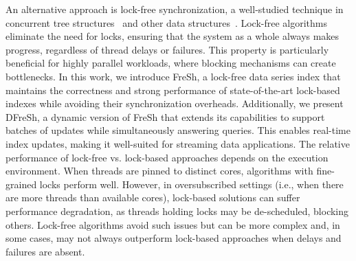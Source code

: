 \documentclass[a4paper,11pt,twoside,openany]{book}
\begin{document}
An alternative approach is lock-free synchronization, a well-studied technique in concurrent 
tree structures~\cite{EFRB10,EFHR14,FR2018,ABF+22} and other data structures~\cite{F04,HS08,FKR18}. 
Lock-free algorithms eliminate the need for locks, ensuring that the system as a whole 
always makes progress, regardless of thread delays or failures. This property is particularly 
beneficial for highly parallel workloads, where blocking mechanisms can create bottlenecks. 
%
In this work, we introduce FreSh, a lock-free data series index that maintains the 
correctness and strong performance of state-of-the-art lock-based indexes while avoiding 
their synchronization overheads. Additionally, we present DFreSh, a dynamic version of 
FreSh that extends its capabilities to support batches of updates while simultaneously 
answering queries. This enables real-time index updates, making it well-suited for streaming
data applications.
%
The relative performance of lock-free vs. lock-based approaches depends on the execution environment.
When threads are pinned to distinct cores, algorithms with fine-grained locks perform well. 
However, in oversubscribed settings (i.e., when there are more threads than available cores),
lock-based solutions can suffer performance degradation, as threads holding locks may be
de-scheduled, blocking others. Lock-free algorithms avoid such issues but can be more complex and,
in some cases, may not always outperform lock-based approaches when delays and failures are absent.
\end{document}
